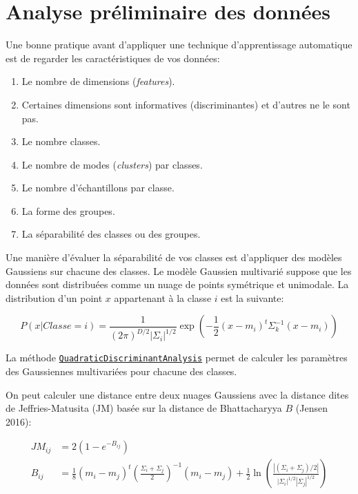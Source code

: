 \documentclass[
  11pt,
  letterpaper,
  open=any,
  twoside=false,
  french]{scrbook}
\begin{document}
\section{Analyse préliminaire des
données}\label{analyse-pruxe9liminaire-des-donnuxe9es}

Une bonne pratique avant d'appliquer une technique d'apprentissage
automatique est de regarder les caractéristiques de vos données:

\begin{enumerate}
\def\labelenumi{\arabic{enumi}.}
\item
  Le nombre de dimensions (\emph{features}).
\item
  Certaines dimensions sont informatives (discriminantes) et d'autres ne
  le sont pas.
\item
  Le nombre classes.
\item
  Le nombre de modes (\emph{clusters}) par classes.
\item
  Le nombre d'échantillons par classe.
\item
  La forme des groupes.
\item
  La séparabilité des classes ou des groupes.
\end{enumerate}

Une manière d'évaluer la séparabilité de vos classes est d'appliquer des
modèles Gaussiens sur chacune des classes. Le modèle Gaussien multivarié
suppose que les données sont distribuées comme un nuage de points
symétrique et unimodale. La distribution d'un point \(x\) appartenant à
la classe \(i\) est la suivante:

\[
P(x | Classe=i) = \frac{1}{(2\pi)^{D/2} |\Sigma_i|^{1/2}}\exp\left(-\frac{1}{2} (x-m_i)^t \Sigma_k^{-1} (x-m_i)\right)
\]

La méthode
\href{https://scikit-learn.org/stable/modules/generated/sklearn.discriminant_analysis.QuadraticDiscriminantAnalysis.html}{\texttt{QuadraticDiscriminantAnalysis}}
permet de calculer les paramètres des Gaussiennes multivariées pour
chacune des classes.

On peut calculer une distance entre deux nuages Gaussiens avec la
distance dites de Jeffries-Matusita (JM) basée sur la distance de
Bhattacharyya \(B\) (Jensen 2016):

\[
\begin{aligned}
JM_{ij} &= 2(1 - e^{-B_{ij}}) \\
B_{ij} &= \frac{1}{8}(m_i - m_j)^t \left( \frac{\Sigma_i + \Sigma_j}{2} \right)^{-1} (m_i - m_j) + \frac{1}{2} \ln \left( \frac{|(\Sigma_i + \Sigma_j)/2|}{|\Sigma_i|^{1/2} |\Sigma_j|^{1/2}} \right)
\end{aligned}
\]
\end{document}
